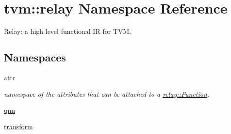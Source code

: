\hypertarget{namespacetvm_1_1relay}{}\section{tvm\+:\+:relay Namespace Reference}
\label{namespacetvm_1_1relay}


Relay\+: a high level functional IR for T\+VM.  


\subsection*{Namespaces}
\begin{DoxyCompactItemize}
\item 
 \hyperlink{namespacetvm_1_1relay_1_1attr}{attr}
\begin{DoxyCompactList}\small\item\em namespace of the attributes that can be attached to a \hyperlink{classtvm_1_1relay_1_1Function}{relay\+::\+Function}. \end{DoxyCompactList}\item 
 \hyperlink{namespacetvm_1_1relay_1_1qnn}{qnn}
\item 
 \hyperlink{namespacetvm_1_1relay_1_1transform}{transform}
\end{DoxyCompactItemize}
